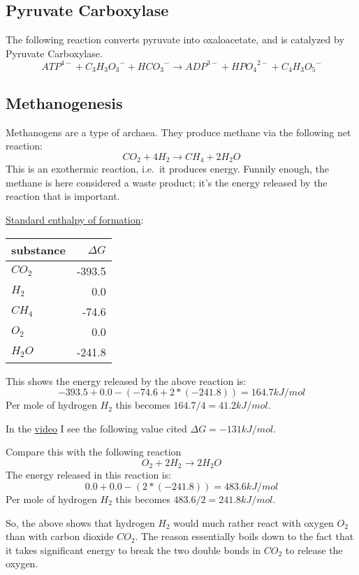 \documentclass{article}
\begin{document}
\subsection{Pyruvate Carboxylase}
The following reaction converts pyruvate into oxaloacetate, and is catalyzed by Pyruvate
Carboxylase.
\[
    {ATP}^{4-} + {C_3H_3O_3}^- + {HCO_3}^- \rightarrow
    {ADP}^{3-} + {HPO_4}^{2-} + {C_4H_3O_5}^-
\]

\subsection{Methanogenesis}
Methanogens are a type of archaea. They produce methane via the following net reaction:
\[
    CO_2 + 4H_2 \rightarrow CH_4 + 2H_2O
\]
This is an exothermic reaction, i.e.\ it produces energy. Funnily enough, the methane
is here considered a waste product; it's the energy released by the reaction that is
important.

\href{https://en.wikipedia.org/wiki/Standard_enthalpy_of_formation}{Standard enthalpy of
formation}:

\begin{tabular}{l  r}         \toprule
    substance & $\Delta G$ \\ \midrule
    $CO_2$    & -393.5     \\
    $H_2$     & 0.0        \\
    $CH_4$    & -74.6      \\
    $O_2$     & 0.0        \\
    $H_2O$    & -241.8     \\ \bottomrule
\end{tabular}

This shows the energy released by the above reaction is:
\[
    -393.5 + 0.0 - (-74.6 + 2*(-241.8)) = 164.7 kJ/mol
\]
Per mole of hydrogen $H_2$ this becomes $164.7/4 = 41.2 kJ/mol$.

In the \href{https://www.youtube.com/watch?v=FWVAyAnrhXU}{video} I see the following value
cited $\Delta G = -131 kJ/mol$.

Compare this with the following reaction
\[
    O_2 + 2H_2 \rightarrow 2H_2O
\]
The energy released in this reaction is:
\[
    0.0 + 0.0 - (2*(-241.8)) = 483.6 kJ/mol
\]
Per mole of hydrogen $H_2$ this becomes $483.6/2 = 241.8 kJ/mol$.

So, the above shows that hydrogen $H_2$ would much rather react with oxygen $O_2$ than
with carbon dioxide $CO_2$. The reason essentially boils down to the fact that it takes
significant energy to break the two double bonds in $CO_2$ to release the oxygen.
\end{document}
